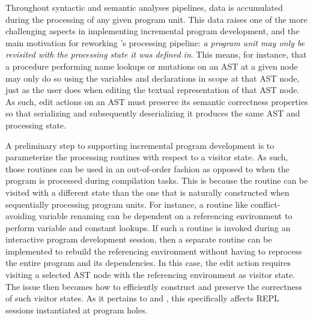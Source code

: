 
Throughout syntactic and semantic analyses pipelines, data is accumulated during the processing of any given program unit.
This data raises one of the more challenging aspects in implementing incremental program development, and the main motivation for reworking \Beluga's processing pipeline: \textit{a program unit may only be revisited with the processing state it was defined in}.
This means, for instance, that a procedure performing name lookups or mutations on an \ac{AST} at a given node may only do so using the variables and declarations in scope at that \ac{AST} node, just as the user does when editing the textual representation of that \ac{AST} node.
As such, edit actions on an \ac{AST} must preserve its semantic correctness properties so that serializing and subsequently deserializing it produces the same \ac{AST} and processing state.


A preliminary step to supporting incremental program development is to parameterize the processing routines with respect to a visitor state.
As such, those routines can be used in an out-of-order fashion as opposed to when the program is processed during compilation tasks.
This is because the routine can be visited with a different state than the one that is naturally constructed when sequentially processing program units.
For instance, a routine like conflict-avoiding variable renaming can be dependent on a referencing environment to perform variable and constant lookups.
If such a routine is invoked during an interactive program development session, then a separate routine can be implemented to rebuild the referencing environment without having to reprocess the entire program and its dependencies.
In this case, the edit action requires visiting a selected \ac{AST} node with the referencing environment as visitor state.
The issue then becomes how to efficiently construct and preserve the correctness of such visitor states.
As it pertains to \Beluga and \Harpoon, this specifically affects \ac{REPL} sessions instantiated at program holes.
